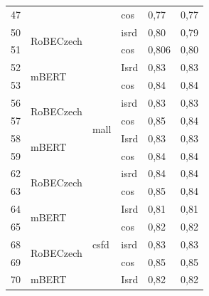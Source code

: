 \begin{table}[]
{\begin{tabular}{|l|l|l|l||ll|}
47 &                            &                           & cos                   & 0,77   & 0,77 \\ \cline{1-2} \cline{4-6} 
50 & \multirow{2}{*}{RoBECzech} &                           & isrd                  & 0,80   & 0,79 \\ \cline{1-1} \cline{4-6} 
51 &                            &                           & cos                   & 0,806  & 0,80 \\ \hline
52 & \multirow{2}{*}{mBERT}     & \multirow{8}{*}{mall}     & Isrd                  & 0,83   & 0,83 \\ \cline{1-1} \cline{4-6} 
53 &                            &                           & cos                   & 0,84   & 0,84 \\ \cline{1-2} \cline{4-6} 
56 & \multirow{2}{*}{RoBECzech} &                           & isrd                  & 0,83   & 0,83 \\ \cline{1-1} \cline{4-6} 
57 &                            &                           & cos                   & 0,85   & 0,84 \\ \cline{1-2} \cline{4-6} 
58 & \multirow{2}{*}{mBERT}     &                           & Isrd                  & 0,83   & 0,83 \\ \cline{1-1} \cline{4-6} 
59 &                            &                           & cos                   & 0,84   & 0,84 \\ \cline{1-2} \cline{4-6} 
62 & \multirow{2}{*}{RoBECzech} &                           & isrd                  & 0,84   & 0,84 \\ \cline{1-1} \cline{4-6} 
63 &                            &                           & cos                   & 0,85   & 0,84 \\ \hline
64 & \multirow{2}{*}{mBERT}     & \multirow{8}{*}{csfd}     & Isrd                  & 0,81   & 0,81 \\ \cline{1-1} \cline{4-6} 
65 &                            &                           & cos                   & 0,82   & 0,82 \\ \cline{1-2} \cline{4-6} 
68 & \multirow{2}{*}{RoBECzech} &                           & isrd                  & 0,83   & 0,83 \\ \cline{1-1} \cline{4-6} 
69 &                            &                           & cos                   & 0,85   & 0,85 \\ \cline{1-2} \cline{4-6} 
70 & \multirow{2}{*}{mBERT}     &                           & Isrd                  & 0,82   & 0,82 \\ \cline{1-1} \cline{4-6} 

\end{tabular}}
\end{table}
